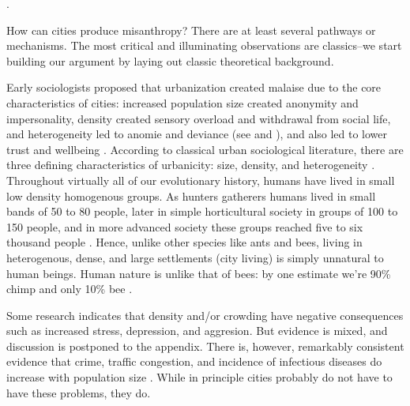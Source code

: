 \documentclass[10pt, letterpaper]{article}
\begin{document}
\begin{spacing}{1.4}
.%

How can cities produce misanthropy? There are at least several pathways or mechanisms. The most %
critical and illuminating observations are classics--we start building our argument by laying out classic
theoretical background.

 Early sociologists proposed that urbanization created malaise due to the core
 characteristics of cities: increased population size created anonymity and
 impersonality, density created sensory overload and withdrawal from social
 life, and heterogeneity led to anomie and deviance (see \citet{park84,
   simmel03, tonnies57} and \citet{wirth38}), and also led to lower trust and wellbeing \cite{putnam07,aok_brfss_segregation15,herbst14,postmes02,vogt07,smelser99}.
%
According to classical urban sociological literature, there are three defining
characteristics of urbanicity: size, density, and heterogeneity \citep{wirth38}. 
Throughout virtually all of our evolutionary history, humans have lived in small low density homogenous groups. As hunters gatherers humans lived in small bands of 50 to 80 people, later in simple horticultural society in groups of 100 to 150 people, and in more advanced society these groups reached five to six thousand people \citep{maryanski92}. Hence, unlike other species like ants and bees, living in heterogenous, dense, and large settlements (city living) is simply unnatural to human beings. {Human nature is unlike that of bees: by one estimate we're 90\% chimp and only 10\% bee \citep{haidt12B}.} 

Some research indicates that density and/or crowding have negative consequences
such as increased stress, depression, and aggresion. But evidence is mixed,
and discussion is postponed to the appendix.
 There is, however, remarkably consistent evidence that crime, traffic
 congestion, and incidence of infectious diseases do increase with population size %
\citep{bettencourt10,bettencourt10b,bettencourt07}.
 While in principle cities probably do not have to have these problems, they do.


\end{spacing}
\end{document}
